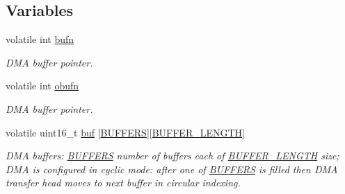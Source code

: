 \subsection*{Variables}
\begin{DoxyCompactItemize}
\item 
\mbox{\label{group___board__model__group_gad2658b77f345b15c03759c02d1ba0e81}} 
volatile int \mbox{\hyperlink{group___board__model__group_gad2658b77f345b15c03759c02d1ba0e81}{bufn}}
\begin{DoxyCompactList}\small\item\em D\+MA buffer pointer. \end{DoxyCompactList}\item 
\mbox{\label{group___board__model__group_gafef4d6ed48b3edc5f7a74defba82e7d8}} 
volatile int \mbox{\hyperlink{group___board__model__group_gafef4d6ed48b3edc5f7a74defba82e7d8}{obufn}}
\begin{DoxyCompactList}\small\item\em D\+MA buffer pointer. \end{DoxyCompactList}\item 
\mbox{\label{group___board__model__group_ga2bab0e665606eb5a547deb0d23446f41}} 
volatile uint16\+\_\+t \mbox{\hyperlink{group___board__model__group_ga2bab0e665606eb5a547deb0d23446f41}{buf}} \mbox{[}\mbox{\hyperlink{group___board__model__group_gaabe0f927d44a09f458bd5fe5ab4e2f7f}{B\+U\+F\+F\+E\+RS}}\mbox{]}\mbox{[}\mbox{\hyperlink{group___board__model__group_gaf7b7dc9a200cb1404c280bd500fd1551}{B\+U\+F\+F\+E\+R\+\_\+\+L\+E\+N\+G\+TH}}\mbox{]}
\begin{DoxyCompactList}\small\item\em D\+MA buffers\+: \mbox{\hyperlink{group___board__model__group_gaabe0f927d44a09f458bd5fe5ab4e2f7f}{B\+U\+F\+F\+E\+RS}} number of buffers each of \mbox{\hyperlink{group___board__model__group_gaf7b7dc9a200cb1404c280bd500fd1551}{B\+U\+F\+F\+E\+R\+\_\+\+L\+E\+N\+G\+TH}} size; D\+MA is configured in cyclic mode\+: after one of \mbox{\hyperlink{group___board__model__group_gaabe0f927d44a09f458bd5fe5ab4e2f7f}{B\+U\+F\+F\+E\+RS}} is filled then D\+MA transfer head moves to next buffer in circular indexing. \end{DoxyCompactList}\item 
\mbox{\label{group___board__model__group_ga3d6043851868b7da3c1d6381f835a559}} 

\end{DoxyCompactItemize}
